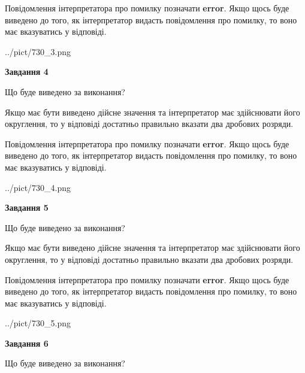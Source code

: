 \documentclass[12pt, ukrainian]{article}
\begin{document}
{\begin {Large}
Повідомлення інтерпретатора про помилку позначати \textbf{error}.
Якщо щось буде виведено до того, як інтерпретатор видасть повідомлення про помилку, 
то воно має вказуватись у відповіді. \par

\begin{center}
	{../pict/730_3.png}
\end{center}
\newpage

{\begin {center}\textbf{Завдання 4}\end {center}}\par
Що буде виведено за виконання? \par

Якщо має бути виведено дійсне значення та інтерпретатор має здійснювати його округлення, 
то у відповіді достатньо правильно вказати два дробових розряди.

Повідомлення інтерпретатора про помилку позначати \textbf{error}.
Якщо щось буде виведено до того, як інтерпретатор видасть повідомлення про помилку, 
то воно має вказуватись у відповіді. \par

\begin{center}
	{../pict/730_4.png}
\end{center}
\newpage

{\begin {center}\textbf{Завдання 5}\end {center}}\par
Що буде виведено за виконання? \par

Якщо має бути виведено дійсне значення та інтерпретатор має здійснювати його округлення, 
то у відповіді достатньо правильно вказати два дробових розряди.

Повідомлення інтерпретатора про помилку позначати \textbf{error}.
Якщо щось буде виведено до того, як інтерпретатор видасть повідомлення про помилку, 
то воно має вказуватись у відповіді. \par

\begin{center}
	{../pict/730_5.png}
\end{center}
\newpage

{\begin {center}\textbf{Завдання 6}\end {center}}\par
Що буде виведено за виконання? \par


\end{Large}}
\end{document}
